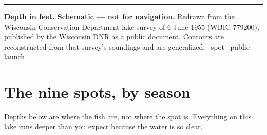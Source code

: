 \vspace{0.2em}
\begin{center}
\scalebox{1.08}{}

\vspace{0.25em}
\begin{minipage}{0.94\linewidth}
\rule{\linewidth}{0.35pt}\par
\vspace{0.15em}
{\fontsize{7}{8.4}\selectfont
\textbf{Depth in feet. Schematic --- not for navigation.} Redrawn from the
Wisconsin Conservation Department lake survey of 6 June 1955 (WBIC 779200),
published by the Wisconsin DNR as a public document. Contours are reconstructed
from that survey's soundings and are generalized.
\quad
{}\quad
{}\quad
{}\quad
{}\quad
{}\quad
{}\quad
{}\quad
{}~spot\quad
{}~public launch
\par}
\end{minipage}
\end{center}

\newpage

\section{The nine spots, by season}

Depths below are where the fish are, not where the spot is. Everything on this
lake runs deeper than you expect because the water is so clear.

